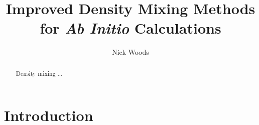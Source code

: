 \documentclass[final,3p,twocolumn]{elsarticle}
\begin{document}
\begin{frontmatter}



\title{Improved Density Mixing Methods for \textit{Ab Initio} Calculations}


\author{Nick Woods}

\address{Cavendish Laboratory, Department of Physics, J J Thomson
  Avenue, Cambridge. CB3 0HE}

\begin{abstract}
Density mixing $\dots$
\end{abstract}

\end{frontmatter}


\section{Introduction}
\end{document}
